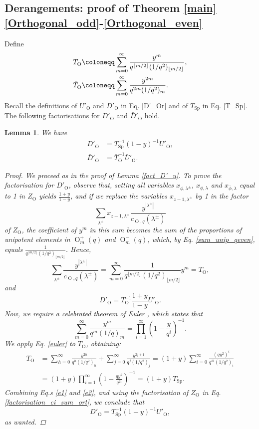 \documentclass[a4paper, 12pt, oneside]{amsart}
\newtheorem{lemma}[prop]{Lemma}
\theoremstyle{definition}
\DeclareMathOperator{\Sp}{Sp}
\DeclareMathOperator{\Or}{O}
\begin{document}
\subsection{Derangements: proof of Theorem \ref{main}\eqref{Orthogonal_odd}-\eqref{Orthogonal_even} }
Define
\begin{align}
T_{\Or} &\coloneqq \sum_{m=0}^{\infty}\frac{y^m}{q^{\lfloor m/2 \rfloor}(1/q^2)_{\lfloor m/2 \rfloor}}, \\
\label{bar{T}}
\bar{T}_{\Or}&\coloneqq \sum_{m=0}^{\infty}\frac{y^{2m}}{q^{2m}(1/q^2)_m}.
\end{align}
Recall the definitions of $U'_{\Or}$ and $D'_{\Or}$ in Eq. \eqref{D'_Or} and of $T_{\Sp}$ in Eq. \eqref{T_Sp}. The following factorisations for $D'_{\Or}$ and $\bar{D}'_{\Or}$ hold.
\begin{lemma}
We have
\label{fact_D'_O}
\begin{align*}
D'_{\Or}&=T_{\Sp}^{-1}(1-y)^{-1}U'_{\Or}, \\
\bar{D}'_{\Or}&=\bar{T}_{\Or}^{-1}\bar{U}'_{\Or}.
\end{align*}
\begin{proof}
We proceed as in the proof of Lemma \ref{fact_D'_u}. 
To prove the factorisation for $D'_{\Or}$, observe that, setting all variables $x_{\phi,\lambda^{\pm}}$, $x_{\phi, \lambda}$ and $x_{\bar{\phi}, \lambda}$ equal to 1 in $Z_{\Or}$ yields $\frac{1+y}{1-y}$, and
if we replace the variables $x_{z-1,\lambda^{\pm}}$ by 1 in the factor
$$\sum_{\lambda^{\pm}}x_{z-1,\lambda^{\pm}}\frac{y^{|\lambda^{\pm}|}}{c_{\Or,q}(\lambda^{\pm})}$$
of $Z_{\Or}$, the coefficient of $y^m$ in this sum becomes the sum of the proportions of unipotent elements in $\Or^{+}_{m}(q)$ and $\Or^{-}_{m}(q)$, which, by Eq. \eqref{sum_unip_qeven}, equals $\frac{1}{q^{\lfloor m/2 \rfloor}(1/q^2)_{\lfloor m/2 \rfloor}}$. Hence,
$$\sum_{\lambda^{\pm}}\frac{y^{|\lambda^{\pm}|}}{c_{\Or,q}(\lambda^{\pm})}=\sum_{m=0}^{\infty}\frac{1}{q^{\lfloor m/2 \rfloor}(1/q^2)_{\lfloor m/2 \rfloor}}y^m=T_{\Or},$$
and 
\begin{equation}
\label{e1}
D'_{\Or}=T_{\Or}^{-1}\frac{1+y}{1-y}U'_{\Or}.
\end{equation}
Now, we require a celebrated theorem of Euler \cite{Euler}, which states that
\begin{equation}
\label{euler}
\sum_{m=0}^{\infty}\frac{y^m}{q^m(1/q)_m}=\prod_{i=1}^{\infty}\left(1-\frac{y}{q^i} \right)^{-1}.
\end{equation}
We apply Eq. \eqref{euler} to $T_{\Or}$, obtaining:
\begin{align}
\label{e2}
T_{\Or}&=\sum_{h=0}^{\infty}\frac{y^{2h}}{q^h(1/q^2)_h}+\sum_{j=0}^{\infty}\frac{y^{2j+1}}{q^j(1/q^2)_j}=(1+y)\sum_{i=0}^{\infty}\frac{(q y^2)^i}{q^{2i}(1/q^2)_i}\\ &=(1+y)\prod_{i=1}^{\infty}\left(1 -\frac{qy^2}{q^{2i}}\right)^{-1}=(1+y)T_{\Sp}.
\end{align}
Combining Eq.s \eqref{e1} and \eqref{e2}, and using the factorisation of $Z_{\Or}$ in Eq. \eqref{factorisation_ci_sum_ort}, we conclude that 
$$D'_{\Or}=T^{-1}_{\Sp}(1-y)^{-1}U'_{\Or},$$
as wanted.


\end{proof}
\end{lemma}
\end{document}
